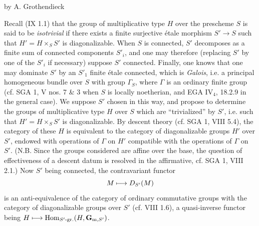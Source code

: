 \label{X}
\begin{center}by A. Grothendieck\end{center}

Recall (IX 1.1) that the group of multiplicative type $H$ over the prescheme $S$ is said to be \emph{isotrivial} if there exists a finite surjective étale morphism $S'\to S$ such that $H'=H\times_S S'$ is diagonalizable. When $S$ is connected, $S'$ decomposes as a finite sum of connected components $S'_i$, and one may therefore (replacing $S'$ by one of the $S'_i$ if necessary) suppose $S'$ connected. Finally, one knows that one may dominate $S'$ by an $S'_1$ finite étale connected, which is \emph{Galois}, i.e. a principal homogeneous bundle over $S$ with group $\Gamma_S$, where $\Gamma$ is an ordinary finite group (cf. SGA 1, V nos. 7 \& 3 when $S$ is locally noetherian, and EGA IV$_4$, 18.2.9 in the general case). We suppose $S'$ chosen in this way, and propose to determine the groups of multiplicative type $H$ over $S$ which are ``trivialized'' by $S'$, i.e. such that $H'=H\times_S S'$ is diagonalizable. By descent theory (cf. SGA 1, VIII 5.4), the category of these $H$ is equivalent to the category of diagonalizable groups $H'$ over $S'$, endowed with operations of $\Gamma$ on $H'$ compatible with the operations of $\Gamma$ on $S'$. (N.B. Since the groups considered are affine over the base, the question of effectiveness of a descent datum is resolved in the affirmative, cf. SGA 1, VIII 2.1.) Now $S'$ being connected, the contravariant functor
\[
M\longmapsto D_{S'}(M)
\]
is an anti-equivalence of the category of ordinary commutative groups with the category of diagonalizable groups over $S'$ (cf. VIII 1.6), a quasi-inverse functor being $H\longmapsto\operatorname{Hom}_{S'\text{-}\mathrm{gr.}}(H,\mathbf{G}_{\mathrm{m},S'})$.
